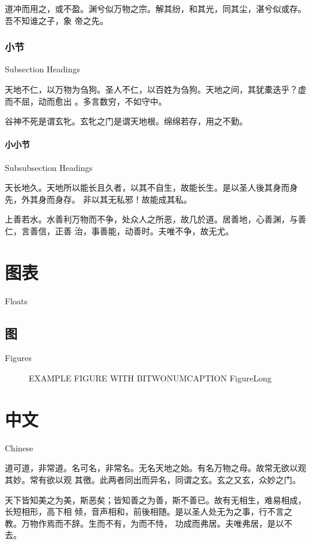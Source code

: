 \documentclass[a4paper, twoside, openany, extrafontsizes]{dlutthesis}
\begin{document}
道冲而用之，或不盈。渊兮似万物之宗。解其纷，和其光，同其尘，湛兮似或存。吾不知谁之子，象
帝之先。

\subsection{小节}{Subsection Headings}
\label{sub:subsection}

天地不仁，以万物为刍狗。圣人不仁，以百姓为刍狗。天地之间，其犹橐迭乎？虚而不屈，动而愈出
。多言数穷，不如守中。

谷神不死是谓玄牝。玄牝之门是谓天地根。绵绵若存，用之不勤。

\subsubsection{小小节}{Subsubsection Headings}
\label{subs:subsubsection}

天长地久。天地所以能长且久者，以其不自生，故能长生。是以圣人後其身而身先，外其身而身存。
非以其无私邪！故能成其私。

上善若水。水善利万物而不争，处众人之所恶，故几於道。居善地，心善渊，与善仁，言善信，正善
治，事善能，动善时。夫唯不争，故无尤。

\chapter{图表}{Floats}
\label{chap:floats}

\section{图}{Figures}
\label{sec:figures}

\begin{figure}[!htbp]
	\centering
	EXAMPLE FIGURE WITH BITWONUMCAPTION
		{Figure}{Long }
\end{figure}


\chapter{中文}{Chinese} %


道可道，非常道。名可名，非常名。无名天地之始。有名万物之母。故常无欲以观其妙。常有欲以观
其徼。此两者同出而异名，同谓之玄。玄之又玄，众妙之门。

天下皆知美之为美，斯恶矣；皆知善之为善，斯不善已。故有无相生，难易相成，长短相形，高下相
倾，音声相和，前後相随。是以圣人处无为之事，行不言之教。万物作焉而不辞。生而不有，为而不恃，
功成而弗居。夫唯弗居，是以不去。
\end{document}
